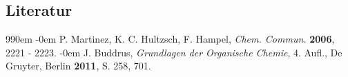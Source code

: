 \documentclass[12pt]{article}
\begin{document}
\begin{onehalfspace}
\section{Literatur}
\renewcommand{\section}[2]{}%

\def\bibindent{0em}
\begin{thebibliography}{99\kern\bibindent}
\makeatletter
\let\old@biblabel\@biblabel
\def\@biblabel#1{\old@biblabel{#1}\kern\bibindent}
\let\old@bibitem\bibitem
\def\bibitem#1{\old@bibitem{#1}\leavevmode\kern-\bibindent}
\makeatother
{}
P. Martinez, K. C. Hultzsch, F. Hampel, \textit{Chem. Commun.} \textbf{2006}, 2221 - 2223.
J. Buddrus, \textit{Grundlagen der Organische Chemie}, 4. Aufl., De Gruyter, Berlin \textbf{2011}, S. 258, 701.
\end{thebibliography}
\end{onehalfspace}
\end{document}
